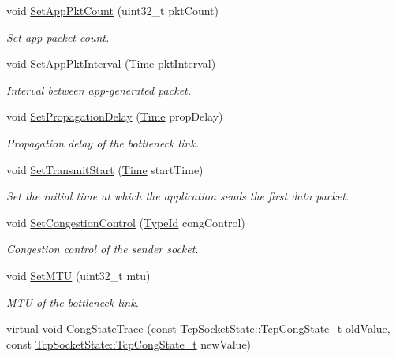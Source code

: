 \begin{DoxyCompactItemize}
void \hyperlink{classns3_1_1TcpGeneralTest_a256c8df5966f89ed0acfc966cd5d3898}{Set\+App\+Pkt\+Count} (uint32\+\_\+t pkt\+Count)
\begin{DoxyCompactList}\small\item\em Set app packet count. \end{DoxyCompactList}\item 
void \hyperlink{classns3_1_1TcpGeneralTest_aa12e09ac2ea2f8b99ad4d9d7871fc7ea}{Set\+App\+Pkt\+Interval} (\hyperlink{classns3_1_1Time}{Time} pkt\+Interval)
\begin{DoxyCompactList}\small\item\em Interval between app-\/generated packet. \end{DoxyCompactList}\item 
void \hyperlink{classns3_1_1TcpGeneralTest_a167056795264e377b425cdac2441b263}{Set\+Propagation\+Delay} (\hyperlink{classns3_1_1Time}{Time} prop\+Delay)
\begin{DoxyCompactList}\small\item\em Propagation delay of the bottleneck link. \end{DoxyCompactList}\item 
void \hyperlink{classns3_1_1TcpGeneralTest_af8d94d931bd7377ff0267a7ce1edc74d}{Set\+Transmit\+Start} (\hyperlink{classns3_1_1Time}{Time} start\+Time)
\begin{DoxyCompactList}\small\item\em Set the initial time at which the application sends the first data packet. \end{DoxyCompactList}\item 
void \hyperlink{classns3_1_1TcpGeneralTest_a34f10ab9653daf7c998083d5d547e66f}{Set\+Congestion\+Control} (\hyperlink{classns3_1_1TypeId}{Type\+Id} cong\+Control)
\begin{DoxyCompactList}\small\item\em Congestion control of the sender socket. \end{DoxyCompactList}\item 
void \hyperlink{classns3_1_1TcpGeneralTest_a892d917a99ab3ce285e7ffec4eac743f}{Set\+M\+TU} (uint32\+\_\+t mtu)
\begin{DoxyCompactList}\small\item\em M\+TU of the bottleneck link. \end{DoxyCompactList}\item 
virtual void \hyperlink{classns3_1_1TcpGeneralTest_ab9b5ce7ade01465c2a0549845518bae0}{Cong\+State\+Trace} (const \hyperlink{classns3_1_1TcpSocketState_a6fc313945a33d48fd60cbffe0c787b19}{Tcp\+Socket\+State\+::\+Tcp\+Cong\+State\+\_\+t} old\+Value, const \hyperlink{classns3_1_1TcpSocketState_a6fc313945a33d48fd60cbffe0c787b19}{Tcp\+Socket\+State\+::\+Tcp\+Cong\+State\+\_\+t} new\+Value)

\end{DoxyCompactItemize}

